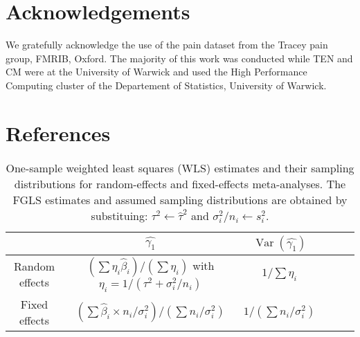 \documentclass[preprint]{elsarticle}
\DeclareMathOperator{\Var}{Var}
\newcommand{\effectvector}{\hat\beta}
\newcommand{\effect}[1][i]{\effectvector_{#1}}
\newcommand{\vareffect}[1][i]{s^2_{#1}}
\newcommand{\metaanalyticeffect}[1][i]{\gamma_{#1}}
\newcommand{\varBetween}{\tau^2}
\newcommand{\estvarBetween}{\hat\tau^2}
\newcommand{\nSubjects}[1][i]{n_{#1}}
\newcommand{\varWithin}[1][i]{\sigma^2_{#1}}
\newcommand{\varWithinConInv}[1][i]{\nSubjects[#1] / \sigma^2_{#1}}
\newcommand{\beginsupplement}{%
        \setcounter{table}{0}
        \renewcommand{\thetable}{S\arabic{table}}%
        \setcounter{figure}{0}
        \renewcommand{\thefigure}{S\arabic{figure}}%
     }
\begin{document}
\section{Acknowledgements}
We gratefully acknowledge the use of the pain dataset from the Tracey pain group, FMRIB, Oxford. The majority of this work was conducted while TEN and CM were at the University of Warwick and used the High Performance Computing cluster of the Departement of Statistics, University of Warwick.

%

\section{References}



\beginsupplement

\begin{table*}[h]
\begin{center}
\setlength{\tabcolsep}{3pt}
\begin{tabular}{cccccl}
				& $\hat{\metaanalyticeffect[1]}$ & $\Var(\hat{\metaanalyticeffect[1]})$ \\
\hline						
Random effects 		& $ \left( \sum \eta_i \effect \right) / \left( \sum \eta_i \right)$ with $\eta_i = 1/(\varBetween + \varWithin/\nSubjects)$ & $1/\sum \eta_i$ \\
Fixed effects 		& $ \left( \sum \effect \times \varWithinConInv \right) / \left(\sum \varWithinConInv \right)$ & $1/(\sum \varWithinConInv)$\\
\hline 
\end{tabular}
\end{center}
\caption{One-sample weighted least squares (WLS) estimates and their sampling distributions for random-effects and fixed-effects meta-analyses. The FGLS estimates and assumed sampling distributions are obtained by substituing: $\varBetween \leftarrow \estvarBetween$ and $\varWithin/\nSubjects \leftarrow \vareffect$.}
\label{table:estimates_wls_test1}
\end{table*}
\end{document}
